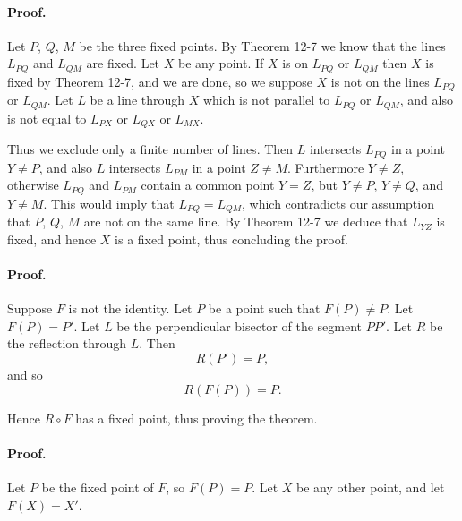 \documentclass[12pt]{book} %
\begin{document}
\begin{ExerciseList}
\begin{ExerciseList}
\begin{ExerciseList}
\paragraph{Proof.}
Let $P$, $Q$, $M$ be the three fixed points. By Theorem 12-7 we
know that the lines $L_{PQ}$ and $L_{QM}$ are fixed. Let $X$ be any point. If $X$ is
on $L_{PQ}$ or $L_{QM}$ then $X$ is fixed by Theorem 12-7, and we are done, so
we suppose $X$ is not on the lines $L_{PQ}$ or $L_{QM}$. Let $L$ be a line through
$X$ which is not parallel to $L_{PQ}$ or $L_{QM}$, and also is not equal to $L_{PX}$ or
$L_{QX}$ or $L_{MX}$.


Thus we exclude only a finite number of lines. Then $L$ intersects $L_{PQ}$ in
a point $Y \ne P$, and also $L$ intersects $L_{PM}$ in a point $Z \ne M$. Furthermore $Y \ne Z$, otherwise $L_{PQ}$ and $L_{PM}$ contain a common point $Y = Z$,
but $Y \ne P$, $Y \ne Q$, and $Y \ne M$. This would imply that $L_{PQ} = L_{QM}$,
which contradicts our assumption that $P$, $Q$, $M$ are not on the same line.
By Theorem 12-7 we deduce that $L_{YZ}$ is fixed, and hence $X$ is a fixed
point, thus concluding the proof.


\paragraph{Proof.}
Suppose $F$ is not the identity. Let $P$ be a point such that
$F(P) \ne P$. Let $F(P) = P'$. Let $L$ be the perpendicular bisector of the segment $PP'$.
Let $R$ be the reflection through $L$. Then
\[
R(P') = P,
\]
and so
\[
R(F(P)) = P.
\]

Hence $R \circ F$ has a fixed point, thus proving the theorem.


\paragraph{Proof.}
Let $P$ be the fixed point of $F$, so $F(P) = P$. Let $X$ be any
other point, and let $F(X) = X'$.


\end{ExerciseList}
\end{ExerciseList}
\end{ExerciseList}
\end{document}
